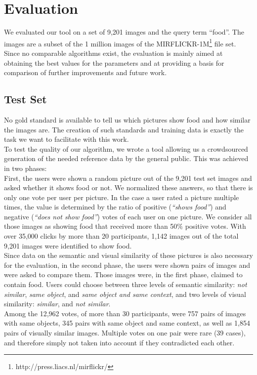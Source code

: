 %
\section{Evaluation}
\label{sec_evaluation}

We evaluated our tool on a set of 9,201 images and the query term ``food''. The images are a subset of the 1 million images of the MIRFLICKR-1M\footnote{http://press.liacs.nl/mirflickr/} file set. Since no comparable algorithms exist, the evaluation is mainly aimed at obtaining the best values for the parameters and at providing a basis for comparison of further improvements and future work.

\subsection{Test Set}
\label{sec_testset}
No gold standard is available to tell us which pictures show food and how similar the images are. The creation of such standards and training data is exactly the task we want to facilitate with this work.\\
To test the quality of our algorithm, we wrote a tool allowing us a crowdsourced generation of the needed reference data by the general public. This was achieved in two phases:\\

First, the users were shown a random picture out of the 9,201 test set images and asked whether it shows food or not. We normalized these answers, so that there is only one vote per user per picture. In the case a user rated a picture multiple times, the value is determined by the ratio of positive (\emph{``shows food''}) and negative (\emph{``does not show food''}) votes of each user on one picture. We consider all those images as showing food that received more than 50\% positive votes. With over 35,000 clicks by more than 20 participants, 1,142 images out of the total 9,201 images were identified to show food. \\

Since data on the semantic and visual similarity of these pictures is also necessary for the evaluation, in the second phase, the users were shown pairs of images and were asked to compare them. Those images were, in the first phase, claimed to contain food. Users could choose between three levels of semantic similarity: \emph{not similar}, \emph{same object}, and \emph{same object and same context}, and two levels of visual similarity: \emph{similar}, and \emph{not similar}.\\
Among the 12,962 votes, of more than 30 participants, were 757 pairs of images with same objects, 345 pairs with same object and same context, as well as 1,854 pairs of visually similar images. Multiple votes on one pair were rare (39 cases), and therefore simply not taken into account if they contradicted each other.

